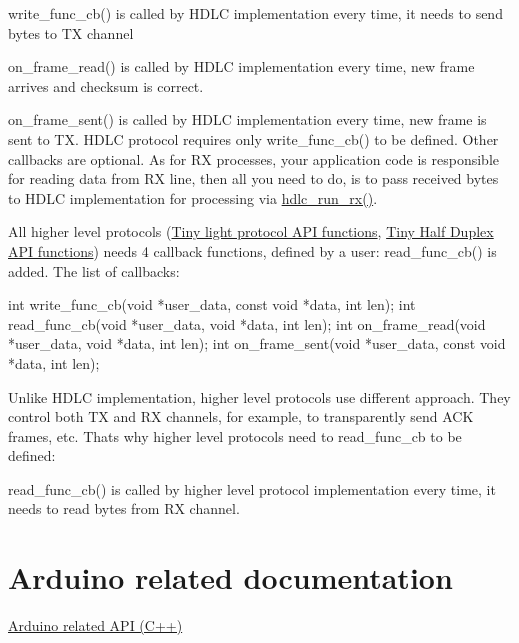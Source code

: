\begin{DoxyItemize}
\item write\+\_\+func\+\_\+cb() is called by H\+D\+LC implementation every time, it needs to send bytes to TX channel
\item on\+\_\+frame\+\_\+read() is called by H\+D\+LC implementation every time, new frame arrives and checksum is correct.
\item on\+\_\+frame\+\_\+sent() is called by H\+D\+LC implementation every time, new frame is sent to TX. H\+D\+LC protocol requires only write\+\_\+func\+\_\+cb() to be defined. Other callbacks are optional. As for RX processes, your application code is responsible for reading data from RX line, then all you need to do, is to pass received bytes to H\+D\+LC implementation for processing via \hyperlink{group__HDLC__API_ga911a3f1cb32dd6cadd00223e0097642c}{hdlc\+\_\+run\+\_\+rx()}.
\end{DoxyItemize}

All higher level protocols (\hyperlink{group__LIGHT__API}{Tiny light protocol A\+PI functions}, \hyperlink{group__HALF__DUPLEX__API}{Tiny Half Duplex A\+PI functions}) needs 4 callback functions, defined by a user\+: read\+\_\+func\+\_\+cb() is added. The list of callbacks\+:


\begin{DoxyCode}
\textcolor{keywordtype}{int} write\_func\_cb(\textcolor{keywordtype}{void} *user\_data, \textcolor{keyword}{const} \textcolor{keywordtype}{void} *data, \textcolor{keywordtype}{int} len);
\textcolor{keywordtype}{int} read\_func\_cb(\textcolor{keywordtype}{void} *user\_data, \textcolor{keywordtype}{void} *data, \textcolor{keywordtype}{int} len);
\textcolor{keywordtype}{int} on\_frame\_read(\textcolor{keywordtype}{void} *user\_data, \textcolor{keywordtype}{void} *data, \textcolor{keywordtype}{int} len);
\textcolor{keywordtype}{int} on\_frame\_sent(\textcolor{keywordtype}{void} *user\_data, \textcolor{keyword}{const} \textcolor{keywordtype}{void} *data, \textcolor{keywordtype}{int} len);
\end{DoxyCode}


Unlike H\+D\+LC implementation, higher level protocols use different approach. They control both TX and RX channels, for example, to transparently send A\+CK frames, etc. That\textquotesingle{}s why higher level protocols need to read\+\_\+func\+\_\+cb to be defined\+:


\begin{DoxyItemize}
\item read\+\_\+func\+\_\+cb() is called by higher level protocol implementation every time, it needs to read bytes from RX channel.
\end{DoxyItemize}\hypertarget{index_arduino_section}{}\section{Arduino related documentation}\label{index_arduino_section}
\hyperlink{arduino}{Arduino related A\+PI (C++)} 